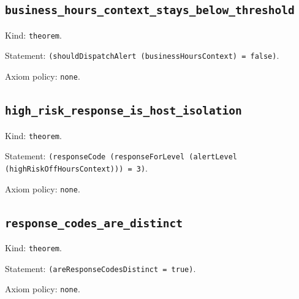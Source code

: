 \documentclass[11pt]{article}
\begin{document}
\subsection*{\texttt{business\_hours\_context\_stays\_below\_threshold}}
\noindent Kind: \texttt{theorem}.\par
\noindent Statement: \texttt{(shouldDispatchAlert (businessHoursContext) = false)}.\par
\noindent Axiom policy: \texttt{none}.\par
\subsection*{\texttt{high\_risk\_response\_is\_host\_isolation}}
\noindent Kind: \texttt{theorem}.\par
\noindent Statement: \texttt{(responseCode (responseForLevel (alertLevel (highRiskOffHoursContext))) = 3)}.\par
\noindent Axiom policy: \texttt{none}.\par
\subsection*{\texttt{response\_codes\_are\_distinct}}
\noindent Kind: \texttt{theorem}.\par
\noindent Statement: \texttt{(areResponseCodesDistinct = true)}.\par
\noindent Axiom policy: \texttt{none}.\par
\end{document}
